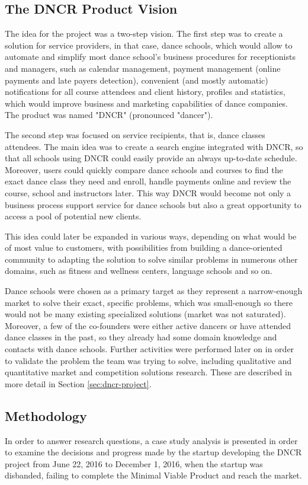 \documentclass{article}
\begin{document}
\subsection{The DNCR Product Vision}
The idea for the project was a two-step vision. The first step was to create a solution for service providers, in that case, dance schools, which would allow to automate and simplify most dance school's business procedures for receptionists and managers, such as calendar management, payment management (online payments and late payers detection), convenient (and mostly automatic) notifications for all course attendees and client history, profiles and statistics, which would improve business and marketing capabilities of dance companies. The product was named "DNCR" (pronounced "dancer").

The second step was focused on service recipients, that is, dance classes attendees. The main idea was to create a search engine integrated with DNCR, so that all schools using DNCR could easily provide an always up-to-date schedule. Moreover, users could quickly compare dance schools and courses to find the exact dance class they need and enroll, handle payments online and review the course, school and instructors later. This way DNCR would become not only a business process support service for dance schools but also a great opportunity to access a pool of potential new clients.

This idea could later be expanded in various ways, depending on what would be of most value to customers, with possibilities from building a dance-oriented community to adapting the solution to solve similar problems in numerous other domains, such as fitness and wellness centers, language schools and so on.

Dance schools were chosen as a primary target as they represent a narrow-enough market to solve their exact, specific problems, which was small-enough so there would not be many existing specialized solutions (market was not saturated). Moreover, a few of the co-founders were either active dancers or have attended dance classes in the past, so they already had some domain knowledge and contacts with dance schools. Further activities were performed later on in order to validate the problem the team was trying to solve, including qualitative and quantitative market and competition solutions research. These are described in more detail in Section \ref{sec:dncr-project}.

\subsection{Methodology}
In order to answer research questions, a case study analysis is presented in order to examine the decisions and progress made by the startup developing the DNCR project from June 22, 2016 to December 1, 2016, when the startup was disbanded, failing to complete the Minimal Viable Product and reach the market.
\end{document}
